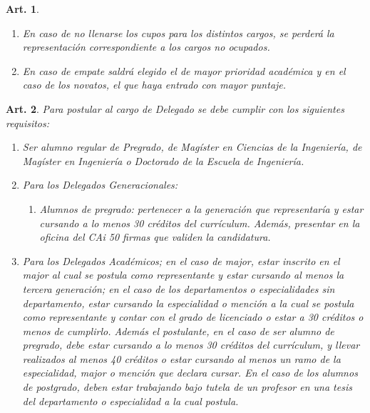 \documentclass[letterpaper,11pt]{article}
\theoremstyle{plain}
\newtheorem{art}{Art.} %
\begin{document}
\begin{art}
\begin{enumerate}
\begin{enumerate}
						\\
						Tratándose del Representante de College será elegida la primera mayoría.
						\item En caso de no llenarse los cupos para los distintos cargos, se perderá la representación correspondiente a los cargos no ocupados.
						\item En caso de empate saldrá elegido el de mayor prioridad académica y en el caso de los novatos, el que haya entrado con mayor puntaje.
					\end{enumerate}
			\end{enumerate}
		\end{art}

		\begin{art}\label{requisitosDelegados}
			Para postular al cargo de Delegado se debe cumplir con los siguientes requisitos:
			\begin{enumerate}
				\item Ser alumno regular de Pregrado, de Magíster en Ciencias de la Ingeniería, de Magíster en Ingeniería o Doctorado de la Escuela de Ingeniería.
				\item Para los Delegados Generacionales:
					\begin{enumerate}
						\item Alumnos de pregrado: pertenecer a la generación que representaría y estar cursando a lo menos 30 créditos del currículum. Además, presentar en la oficina del CAi 50 firmas que validen la candidatura.
					\end{enumerate}
				\item Para los Delegados Académicos; en el caso de major, estar inscrito en el major al cual se postula como representante y estar cursando al menos la tercera generación; en el caso de los departamentos o especialidades sin departamento, estar cursando la especialidad o mención a la cual se postula como representante y contar con el grado de licenciado o estar a 30 créditos o menos de cumplirlo. Además el postulante, en el caso de ser alumno de pregrado, debe estar cursando a lo menos 30 créditos del currículum, y llevar realizados al menos 40 créditos o estar cursando al menos un ramo de la especialidad, major o mención que declara cursar. En el caso de los alumnos de postgrado, deben estar trabajando bajo tutela de un profesor en una tesis del departamento o especialidad a la cual postula.
			\end{enumerate}
		\end{art}
\end{document}
